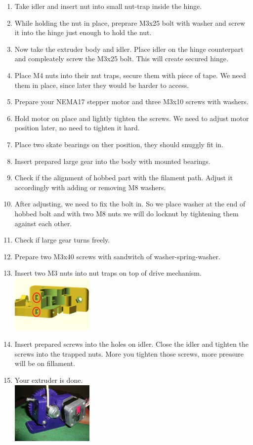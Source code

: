 \documentclass[11pt]{article}
\begin{document}
\begin{enumerate}
\item Take idler and insert nut into small nut-trap inside the hinge.
\item While holding the nut in place, preprare M3x25 bolt with washer and screw it into the hinge just enough to hold the nut.
\item Now take the extruder body and idler. Place idler on the hinge counterpart and compleately screw the M3x25 bolt. This will create secured hinge.
\item Place M4 nuts into their nut traps, secure them with piece of tape. We need them in place, since later they would be harder to access.
\item Prepare your NEMA17 stepper motor and three M3x10 screws with washers.
\item Hold motor on place and lightly tighten the screws. We need to adjust motor position later, no need to tighten it hard.
\item Place two skate bearings on ther position, they should snuggly fit in.
\item Insert prepared large gear into the body with mounted bearings.
\item Check if the alignment of hobbed part with the filament path. Adjust it accordingly with adding or removing M8 washers.
\item After adjusting, we need to fix the bolt in. So we place washer at the end of hobbed bolt and with two M8 nuts we will do locknut by tightening them against each other.
\item Check if large gear turns freely.
\item Prepare two M3x40 screws with sandwitch of washer-spring-washer.
\item Insert two M3 nuts into nut traps on top of drive mechanism.\\ \includegraphics[width=4cm]{images/extruder/top-nut-traps.png}
\item Insert prepared screws into the holes on idler. Close the idler and tighten the screws into the trapped nuts. More you tighten those screws, more pressure will be on fillament.
\item Your extruder is done.\\ \includegraphics[width=4cm]{images/extruder/assembled.jpg}
\end{enumerate}

\newpage
\end{document}
